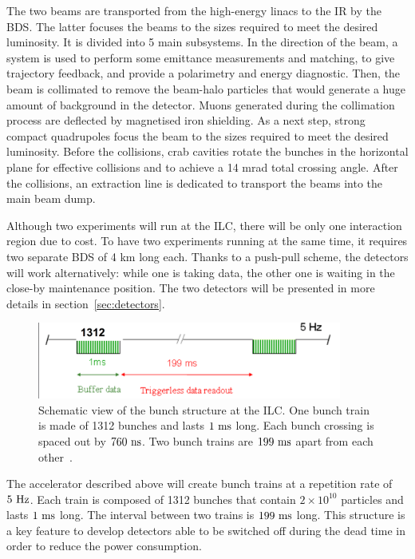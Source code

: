    The two beams are transported from the high-energy linacs to the \gls{IR} by the \gls{BDS}.
    The latter focuses the beams to the sizes required to meet the desired luminosity.
    It is divided into 5 main subsystems. 
    In the direction of the beam, a system is used to perform some emittance measurements and matching, to give trajectory feedback, and provide a polarimetry and energy diagnostic. 
    Then, the beam is collimated to remove the beam-halo particles that would generate a huge amount of background in the detector.
    Muons generated during the collimation process are deflected by magnetised iron shielding.
    As a next step, strong compact quadrupoles focus the beam to the sizes required to meet the desired luminosity. 
    Before the collisions, crab cavities rotate the bunches in the horizontal plane for effective collisions and to achieve a 14 mrad total crossing angle.
    After the collisions, an extraction line is dedicated to transport the beams into the main beam dump.

    Although two experiments will run at the \gls{ILC}, there will be only one interaction region due to cost.
    To have two experiments running at the same time, it requires two separate \gls{BDS} of 4 km long each.
    Thanks to a push-pull scheme, the detectors will work alternatively: while one is taking data, the other one is waiting in the close-by maintenance position.
    The two detectors will be presented in more details in section~\ref{sec:detectors}.
    
    \begin{figure}[!h]
      \centering
      \includegraphics[width = 10cm]{Pictures/ILC/bunchTrainILC.png}
      \caption{Schematic view of the bunch structure at the ILC. One bunch train is made of 1312 bunches and lasts $1~\rm{ms}$ long. Each bunch crossing is spaced out by $760~\rm{ns}$. Two bunch trains are $199~\rm{ms}$ apart from each other~\cite{Li2010}.}
      \label{fig:bunches}
    \end{figure}

    The accelerator described above will create bunch trains at a repetition rate of $5~\rm{Hz}$. 
    Each train is composed of 1312 bunches that contain $2\times 10^{10}$ particles and lasts $1~\rm{ms}$ long. 
    The interval between two trains is $199~\rm{ms}$ long. 
    This structure is a key feature to develop detectors able to be switched off during the dead time in order to reduce the power consumption.

